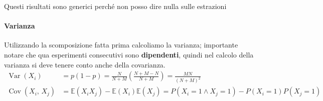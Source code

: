 \noindent Questi risultati sono generici perché non posso dire nulla sulle estrazioni 

\paragraph{Varianza}
Utilizzando la scomposizione fatta prima calcoliamo la varianza; importante notare che qua esperimenti consecutivi sono \textbf{dipendenti}, quindi nel calcolo della varianza si deve tenere conto anche della covarianza.
\begin{align*}
\operatorname{Var}(X_i) &= p(1-p) = \frac{N}{N + M} \left( \frac{N + M - N}{N + M}\right) = \frac{M N}{(N+M)^2} \\
\operatorname{Cov}(X_i, \, X_j) &= \mathbb{E}(X_i X_j) - \mathbb{E}(X_i) \mathbb{E}(X_j) = P(X_i = 1 \wedge X_j = 1) - P(X_i = 1) P(X_j = 1)
\end{align*}

